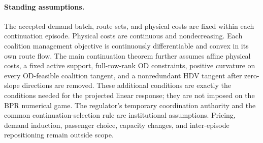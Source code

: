 \paragraph{Standing assumptions.}
The accepted demand batch, route sets, and physical costs are fixed within each continuation episode. Physical costs are continuous and nondecreasing. Each coalition management objective is continuously differentiable and convex in its own route flow. The main continuation theorem further assumes affine physical costs, a fixed active support, full-row-rank OD constraints, positive curvature on every OD-feasible coalition tangent, and a nonredundant HDV tangent after zero-slope directions are removed. These additional conditions are exactly the conditions needed for the projected linear response; they are not imposed on the BPR numerical game. The regulator's temporary coordination authority and the common continuation-selection rule are institutional assumptions. Pricing, demand induction, passenger choice, capacity changes, and inter-episode repositioning remain outside scope.
